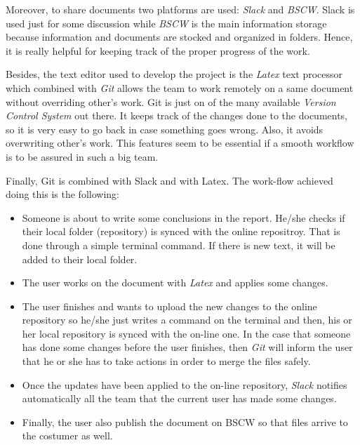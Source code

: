 Moreover, to share documents two platforms are used: \textit{Slack} and \textit{BSCW}. Slack is used just for some discussion while \textit{BSCW} is the main information storage because information and documents are stocked and organized in folders. Hence, it is really helpful for keeping track of the proper progress of the work. 
\newline

Besides, the text editor used to develop the project is the \textit{Latex} text processor which combined with \textit{Git} allows the team to work remotely on a same document without overriding other's work.  Git is just on of the many available \textit{Version Control System} out there. It keeps track of the changes done to the documents, so it is very easy to go back in case something goes wrong. Also, it avoids overwriting other's work. This features seem to be essential if a smooth workflow is to be assured in such a big team.

Finally, Git is combined with Slack and with Latex. The work-flow achieved doing this is the following:

\begin{itemize}
\item Someone is about to write some conclusions in the report. He/she checks if their local folder (repository) is synced  with the online repositroy. That is done through a simple terminal command. If there is new text, it will be added to their local folder.
\item The user works on the document with \textit{Latex} and applies some changes.
\item The user finishes and wants to upload the new changes to the online repository so he/she just writes a command on the terminal and then, his or her local repository is synced with the on-line one. In the case that someone has done some changes before the user finishes, then  \textit{Git} will inform the user that he or she has to take actions in order to merge the files safely.
\item Once the updates have been applied to the on-line repository, \textit{Slack} notifies automatically all the team that the current user has made some changes.
\item Finally, the user also publish the document on BSCW so that files arrive to the costumer as well.
\end{itemize}

